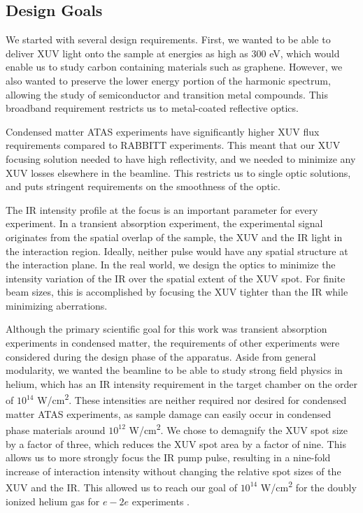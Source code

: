 \subsection{Design Goals}

We started with several design requirements. First, we wanted to be able to deliver XUV light onto the sample at energies as high as 300 eV, which would enable us to study carbon containing materials such as graphene. However, we also wanted to preserve the lower energy portion of the harmonic spectrum, allowing the study of semiconductor and transition metal compounds. This broadband requirement restricts us to metal-coated reflective optics.

Condensed matter ATAS experiments have significantly higher XUV flux requirements compared to RABBITT experiments. This meant that our XUV focusing solution needed to have high reflectivity, and we needed to minimize any XUV losses elsewhere in the beamline. This restricts us to single optic solutions, and puts stringent requirements on the smoothness of the optic.

The IR intensity profile at the focus is an important parameter for every experiment. In a transient absorption experiment, the experimental signal originates from the spatial overlap of the sample, the XUV and the IR light in the interaction region. Ideally, neither pulse would have any spatial structure at the interaction plane. In the real world, we design the optics to minimize the intensity variation of the IR over the spatial extent of the XUV spot. For finite beam sizes, this is accomplished by focusing the XUV tighter than the IR while minimizing aberrations.

Although the primary scientific goal for this work was transient absorption experiments in condensed matter, the requirements of other experiments were considered during the design phase of the apparatus. Aside from general modularity, we wanted the beamline to be able to study strong field physics in helium, which has an IR intensity requirement in the target chamber on the order of $10^{14}$ W/cm\textsuperscript{2}. These intensities are neither required nor desired for condensed matter ATAS experiments, as sample damage can easily occur in condensed phase materials around  $10^{12}$ W/cm\textsuperscript{2}. We chose to demagnify the XUV spot size by a factor of three, which reduces the XUV spot area by a factor of nine. This allows us to more strongly focus the IR pump pulse, resulting in a nine-fold increase of interaction intensity without changing the relative spot sizes of the XUV and the IR. This allowed us to reach our goal of $10^{14}$ W/cm\textsuperscript{2} for the doubly ionized helium gas for $e-2e$ experiments \cite{kiesewetterDynamicsNearThresholdAttosecond2019}.

